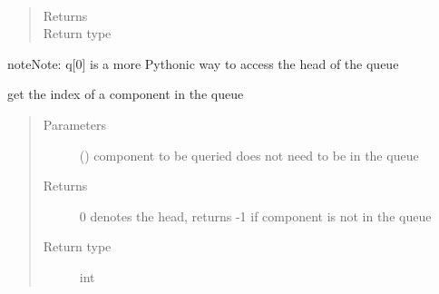 \documentclass[letterpaper,10pt,english]{sphinxmanual}
\begin{document}
\begin{fulllineitems}
\begin{fulllineitems}
\end{fulllineitems}


\begin{fulllineitems}
\label{\detokenize{Reference:salabim.Queue.head}}~\begin{quote}\begin{description}
\item[{Returns}] \leavevmode
{}

\item[{Return type}] \leavevmode
{\hyperref[\detokenize{Reference:salabim.Component}]{}}

\end{description}\end{quote}

\begin{sphinxadmonition}{note}{Note:}
q{[}0{]} is a more Pythonic way to access the head of the queue
\end{sphinxadmonition}

\end{fulllineitems}


\begin{fulllineitems}
\label{\detokenize{Reference:salabim.Queue.index}}
get the index of a component in the queue
\begin{quote}\begin{description}
\item[{Parameters}] \leavevmode
{} ({\hyperref[\detokenize{Reference:salabim.Component}]{}}) \textendash{} component to be queried 
does not need to be in the queue

\item[{Returns}] \leavevmode
{} \textendash{} 0 denotes the head, 
returns -1 if component is not in the queue

\item[{Return type}] \leavevmode
int

\end{description}\end{quote}


\end{fulllineitems}
\end{fulllineitems}
\end{document}
